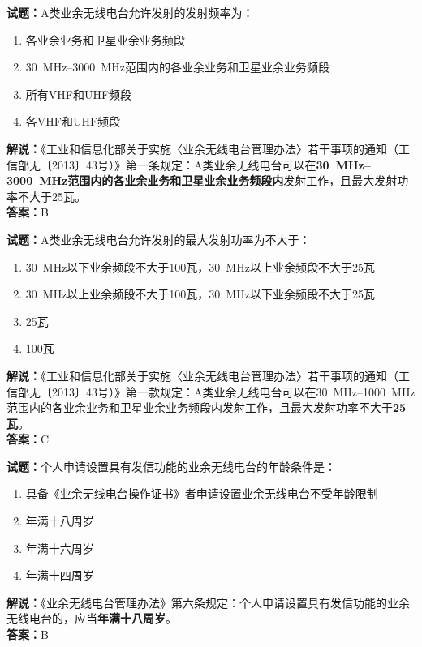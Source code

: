 \documentclass{ctexbook}
\begin{document}
\bigskip

\noindent\textbf{试题：}A类业余无线电台允许发射的发射频率为：
\begin{enumerate}[leftmargin=3em]
  \item 各业余业务和卫星业余业务频段
  \item \qtyrange{30}{3000}{\MHz}范围内的各业余业务和卫星业余业务频段
  \item 所有VHF和UHF频段
  \item 各VHF和UHF频段
\end{enumerate}
\noindent\textbf{解说：}《工业和信息化部关于实施〈业余无线电台管理办法〉若干事项的通知（工信部无〔2013〕43号）》第一条规定：A类业余无线电台可以在\textbf{\qtyrange{30}{3000}{\MHz}范围内的各业余业务和卫星业余业务频段内}发射工作，且最大发射功率不大于\num{25}瓦。\\\noindent\textbf{答案：}B

\bigskip

\noindent\textbf{试题：}A类业余无线电台允许发射的最大发射功率为不大于：
\begin{enumerate}[leftmargin=3em]
  \item \qty{30}{\MHz}以下业余频段不大于\num{100}瓦，\qty{30}{\MHz}以上业余频段不大于\num{25}瓦
  \item \qty{30}{\MHz}以上业余频段不大于\num{100}瓦，\qty{30}{\MHz}以下业余频段不大于\num{25}瓦
  \item \num{25}瓦
  \item \num{100}瓦
\end{enumerate}
\noindent\textbf{解说：}《工业和信息化部关于实施〈业余无线电台管理办法〉若干事项的通知（工信部无〔2013〕43号）》第一款规定：A类业余无线电台可以在\qtyrange{30}{1000}{\MHz}范围内的各业余业务和卫星业余业务频段内发射工作，且最大发射功率不大于\textbf{\num{25}瓦}。\\\noindent\textbf{答案：}C

\bigskip

\noindent\textbf{试题：}个人申请设置具有发信功能的业余无线电台的年龄条件是：
\begin{enumerate}[leftmargin=3em]
  \item 具备《业余无线电台操作证书》者申请设置业余无线电台不受年龄限制
  \item 年满十八周岁
  \item 年满十六周岁
  \item 年满十四周岁
\end{enumerate}
\noindent\textbf{解说：}《业余无线电台管理办法》第六条规定：个人申请设置具有发信功能的业余无线电台的，应当\textbf{年满十八周岁}。\\\noindent\textbf{答案：}B
\end{document}
